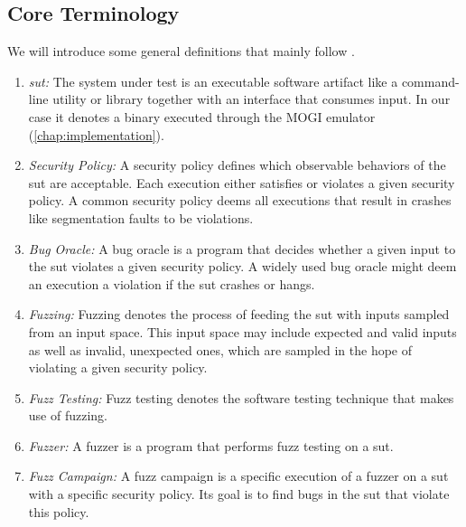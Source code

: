 \subsection{Core Terminology}\label{sec:fuzzing-definitions}

We will introduce some general definitions that mainly follow \textcite{manes_art_2019}.

\begin{enumerate}
  \item \emph{\Gls{sut}:}
    The system under test is an executable software artifact like a command-line utility
    or library together with an interface that consumes input. In our case it denotes
    a binary executed through the MOGI emulator (\cref{chap:implementation}).

  \item \emph{Security Policy:}
    A security policy defines which observable behaviors of the \gls{sut} are acceptable.
    Each execution either satisfies or violates a given security policy. A common
    security policy deems all executions that result in crashes like segmentation
    faults to be violations.

  \item \emph{Bug Oracle:}
    A bug oracle is a program that decides whether a given input to the \gls{sut} violates
    a given security policy. A widely used bug oracle might deem an execution
    a violation if the \gls{sut} crashes or hangs.

  \item \emph{Fuzzing:}
    Fuzzing denotes the process of feeding the \gls{sut} with inputs sampled from an input space.
    This input space may include expected and valid inputs as well as invalid, unexpected
    ones, which are sampled in the hope of violating a given security policy.

  \item \emph{Fuzz Testing:}
    Fuzz testing denotes the software testing technique that makes use of fuzzing.

  \item \emph{Fuzzer:}
    A fuzzer is a program that performs fuzz testing on a \gls{sut}.

  \item \emph{Fuzz Campaign:}
    A fuzz campaign is a specific execution of a fuzzer on a \gls{sut} with a specific
    security policy. Its goal is to find bugs in the \gls{sut} that violate this policy.


\end{enumerate}

